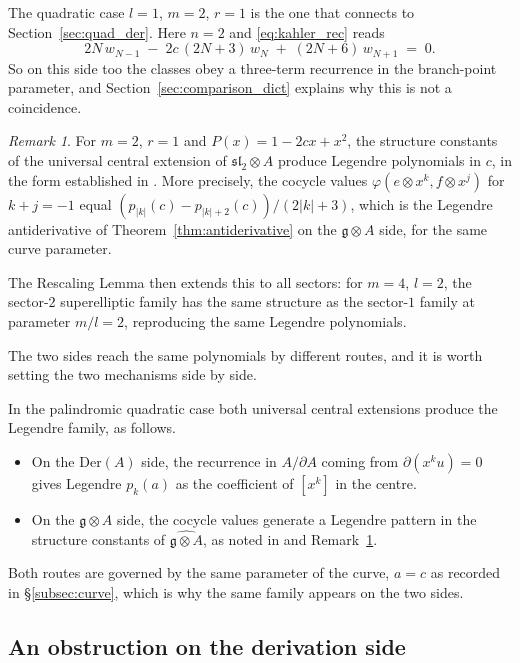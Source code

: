 \documentclass[11pt]{amsart}
\theoremstyle{definition}
\theoremstyle{remark}
\newtheorem{remark}[theorem]{Remark}
\newcommand{\g}{\mathfrak{g}}
\newcommand{\Der}{\mathrm{Der}}
\newcommand{\pa}{\partial}
\newcommand{\hg}{\widehat{\g\otimes A}}
\newcommand{\ox}{\otimes}
\newcommand{\sltwo}{\mathfrak{sl}_2}
\begin{document}
The quadratic case $l=1$, $m=2$, $r=1$ is the one that connects to
Section~\ref{sec:quad_der}. Here $n=2$ and \eqref{eq:kahler_rec} reads
\[
  2N\,w_{N-1} \;-\; 2c\,(2N+3)\,w_{N} \;+\; (2N+6)\,w_{N+1} \;=\; 0 .
\]
So on this side too the classes obey a three-term recurrence in the
branch-point parameter, and Section~\ref{sec:comparison_dict} explains why this
is not a coincidence.

\begin{remark}\label{rem:SNF_legendre}
For $m=2$, $r=1$ and $P(x) = 1-2cx+x^2$, the structure constants
of the universal central extension of $\sltwo\ox A$ produce Legendre
polynomials in $c$, in the form established in
\cite{SantosNeklyudovFutorny2025}.
More precisely, the cocycle values $\varphi(e\ox x^k, f\ox x^j)$ for $k+j=-1$
equal $(p_{|k|}(c)-p_{|k|+2}(c))/(2|k|+3)$, which is the Legendre
antiderivative of Theorem~\ref{thm:antiderivative} on the $\g\otimes A$ side,
for the same curve parameter.

The Rescaling Lemma then extends this to all sectors:
for $m=4$, $l=2$, the sector-$2$ superelliptic family has the same
structure as the sector-$1$ family at parameter $m/l = 2$,
reproducing the same Legendre polynomials.
\end{remark}

The two sides reach the same polynomials by different routes, and it is worth
setting the two mechanisms side by side.

In the palindromic quadratic case both universal central extensions produce the
Legendre family, as follows.
\begin{itemize}
\item On the $\Der(A)$ side, the recurrence in $A/\pa A$ coming from $\pa(x^k u)=0$
  gives Legendre $p_k(a)$ as the coefficient of $[x^k]$ in the centre.
\item On the $\g\otimes A$ side, the cocycle values generate a Legendre
  pattern in the structure constants of $\hg$, as noted in
  \cite{SantosNeklyudovFutorny2025} and Remark~\ref{rem:SNF_legendre}.
\end{itemize}
Both routes are governed by the same parameter of the curve, $a=c$ as recorded
in \S\ref{subsec:curve}, which is why the same family appears on the two sides.

\subsection{An obstruction on the derivation side}
\label{subsec:casimir_entry}
\end{document}

